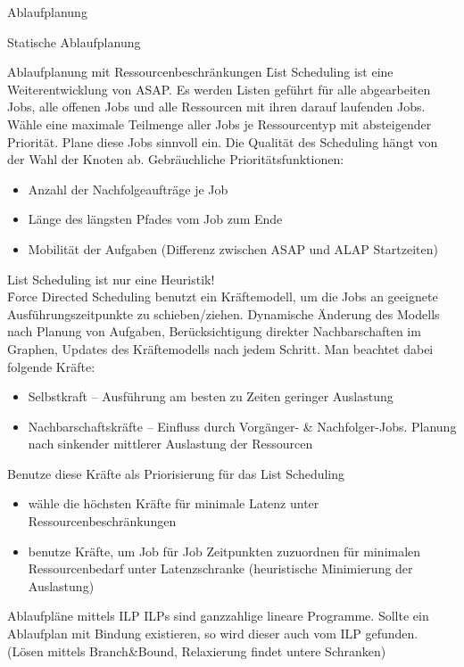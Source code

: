\begin{chapter}{Ablaufplanung}
\begin{section}{Statische Ablaufplanung}
\begin{subsection}{Ablaufplanung mit Ressourcenbeschränkungen}
    \f{List Scheduling} ist eine Weiterentwicklung von ASAP. Es werden Listen geführt für alle abgearbeiten Jobs, alle offenen Jobs und alle Ressourcen mit ihren darauf laufenden Jobs. Wähle eine maximale Teilmenge aller Jobs je Ressourcentyp mit absteigender Priorität.  Plane diese Jobs sinnvoll ein. Die Qualität des Scheduling hängt von der Wahl der Knoten ab. Gebräuchliche Prioritätsfunktionen:
    \begin{itemize}
     \item Anzahl der Nachfolgeaufträge je Job
     \item Länge des längsten Pfades vom Job zum Ende
     \item Mobilität der Aufgaben (Differenz zwischen ASAP und ALAP Startzeiten)
    \end{itemize}
    List Scheduling ist nur eine Heuristik!\\
    
    \f{Force Directed Scheduling} benutzt ein Kräftemodell, um die Jobs an geeignete Ausführungszeitpunkte zu schieben/ziehen. Dynamische Änderung des Modells nach Planung von Aufgaben, Berücksichtigung direkter Nachbarschaften im Graphen, Updates des Kräftemodells nach jedem Schritt. Man beachtet dabei folgende Kräfte:
    \begin{itemize}
     \item Selbstkraft -- Ausführung am besten zu Zeiten geringer Auslastung
     \item Nachbarschaftskräfte -- Einfluss durch Vorgänger- \& Nachfolger-Jobs. Planung nach sinkender mittlerer Auslastung der Ressourcen
    \end{itemize}
    Benutze diese Kräfte als Priorisierung für das List Scheduling
    \begin{itemize}
      \item wähle die höchsten Kräfte für minimale Latenz unter Ressourcenbeschränkungen
      \item benutze Kräfte, um Job für Job Zeitpunkten zuzuordnen für minimalen Ressourcenbedarf unter Latenzschranke (heuristische Minimierung der Auslastung)
    \end{itemize}
   \end{subsection}
   
   \begin{subsection}{Ablaufpläne mittels ILP}
    ILPs sind ganzzahlige lineare Programme. Sollte ein Ablaufplan mit Bindung existieren, so wird dieser auch vom ILP gefunden. (Lösen mittels Branch\&Bound, Relaxierung findet untere Schranken)
   \end{subsection}
  \end{section}
  

\end{chapter}
